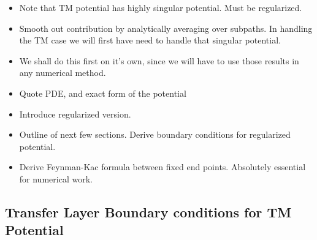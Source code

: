 \begin{itemize}
  \item {Note that TM potential has highly singular potential.  Must be regularized.}
  \item Smooth out contribution by analytically averaging over subpaths.
    In handling the TM case we will first have need to handle that singular potential.
  \item We shall do this first on it's own, since we will have to use those results in any numerical method.

  \item Quote PDE, and exact form of the potential
  \item Introduce regularized version.  
  \item Outline of next few sections.  Derive boundary conditions for regularized potential.  
  \item Derive Feynman-Kac formula between fixed end points.  Absolutely essential for numerical
    work.
\end{itemize}


\subsection{Transfer Layer Boundary conditions for TM Potential}

